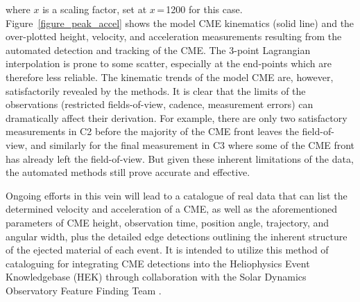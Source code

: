 \documentclass[preprint2]{aastex}
\begin{document}
where $x$ is a scaling factor, set at $x$\,=\,1200 for this case. Figure~\ref{figure_peak_accel} shows the model CME kinematics (solid line) and the over-plotted height, velocity, and acceleration measurements resulting from the automated detection and tracking of the CME. The 3-point Lagrangian interpolation is prone to some scatter, especially at the end-points which are therefore less reliable. The kinematic trends of the model CME are, however, satisfactorily revealed by the methods. It is clear that the limits of the observations (restricted fields-of-view, cadence, measurement errors) can dramatically affect their derivation. For example, there are only two satisfactory measurements in C2 before the majority of the CME front leaves the field-of-view, and similarly for the final measurement in C3 where some of the CME front has already left the field-of-view. But given these inherent limitations of the data, the automated methods still prove accurate and effective. 

Ongoing efforts in this vein will lead to a catalogue of real data that can list the determined velocity and acceleration of a CME, as well as the aforementioned parameters of CME height, observation time, position angle, trajectory, and angular width, plus the detailed edge detections outlining the inherent structure of the ejected material of each event. It is intended to utilize this method of cataloguing for integrating CME detections into the Heliophysics Event Knowledgebase (HEK) through collaboration with the Solar Dynamics Observatory Feature Finding Team \citep[SDO FFT;][]{2011SoPh..tmp..144M}.
\end{document}

